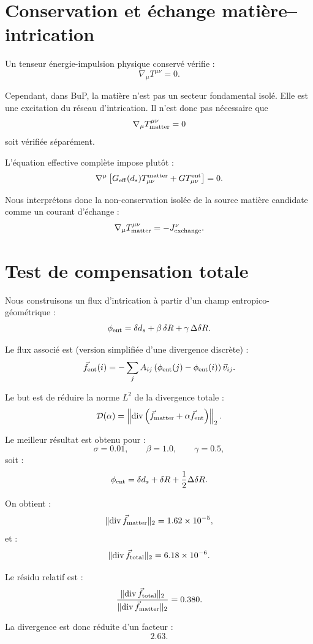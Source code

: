 \documentclass[11pt,a4paper]{article}
\begin{document}
\section{Conservation et échange matière--intrication}

Un tenseur énergie-impulsion physique conservé vérifie :
\[
\nabla_\mu T^{\mu\nu} = 0.
\]

Cependant, dans BuP, la matière n'est pas un secteur fondamental isolé. Elle est
une excitation du réseau d'intrication. Il n'est donc pas nécessaire que
\[
\nabla_\mu T_{\rm matter}^{\mu\nu} = 0
\]
soit vérifiée séparément.

L'équation effective complète impose plutôt :
\[
\nabla^\mu
\left[
G_{\rm eff}(d_s) T_{\mu\nu}^{\rm matter}
+
G T_{\mu\nu}^{\rm ent}
\right]
= 0.
\]

Nous interprétons donc la non-conservation isolée de la source matière candidate
comme un courant d'échange :
\[
\nabla_\mu T_{\rm matter}^{\mu\nu}
= - J_{\rm exchange}^{\nu}.
\]

\section{Test de compensation totale}

Nous construisons un flux d'intrication à partir d'un champ
entropico-géométrique :
\[
\phi_{\rm ent}
=
\delta d_s
+
\beta\,\delta R
+
\gamma\,\Delta\delta R.
\]

Le flux associé est (version simplifiée d'une divergence discrète) :
\[
\vec f_{\rm ent}(i)
=
-\sum_j A_{ij}
\left(
\phi_{\rm ent}(j) - \phi_{\rm ent}(i)
\right)
\vec v_{ij}.
\]

Le but est de réduire la norme \(L^2\) de la divergence totale :
\[
\mathcal{D}(\alpha)
=
\left\|
\mathrm{div}
\left(
\vec f_{\rm matter}
+
\alpha \vec f_{\rm ent}
\right)
\right\|_2.
\]

Le meilleur résultat est obtenu pour :
\[
\sigma = 0.01,
\qquad
\beta = 1.0,
\qquad
\gamma = 0.5,
\]
soit :
\[
\phi_{\rm ent}
=
\delta d_s
+
\delta R
+
\frac12 \Delta\delta R.
\]

On obtient :
\[
\|\mathrm{div}\,\vec f_{\rm matter}\|_2
=
1.62 \times 10^{-5},
\]
et :
\[
\|\mathrm{div}\,\vec f_{\rm total}\|_2
=
6.18 \times 10^{-6}.
\]

Le résidu relatif est :
\[
\frac{
\|\mathrm{div}\,\vec f_{\rm total}\|_2
}{
\|\mathrm{div}\,\vec f_{\rm matter}\|_2
}
=
0.380.
\]

La divergence est donc réduite d'un facteur :
\[
2.63.
\]
\end{document}
